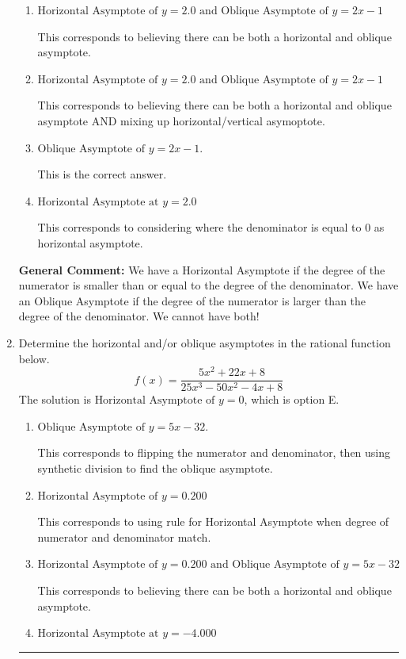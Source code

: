 \documentclass{extbook}[14pt]
\newcommand{\litem}[1]{\item #1

\rule{\textwidth}{0.4pt}}
\begin{document}
\begin{enumerate}
{\begin{enumerate}[label=\Alph*.]
This corresponds to using rule for Horizontal Asymptote when degree of numerator and denominator match.
\item \( \text{Horizontal Asymptote of } y = 2.0 \text{ and Oblique Asymptote of } y = 2x -1 \)

This corresponds to believing there can be both a horizontal and oblique asymptote.
\item \( \text{Horizontal Asymptote of } y = 2.0 \text{ and Oblique Asymptote of } y = 2x -1 \)

This corresponds to believing there can be both a horizontal and oblique asymptote AND mixing up horizontal/vertical asymoptote.
\item \( \text{Oblique Asymptote of } y = 2x -1. \)

This is the correct answer.
\item \( \text{Horizontal Asymptote at } y = 2.0 \)

This corresponds to considering where the denominator is equal to 0 as horizontal asymptote.
\end{enumerate}

\textbf{General Comment:} We have a Horizontal Asymptote if the degree of the numerator is smaller than or equal to the degree of the denominator. We have an Oblique Asymptote if the degree of the numerator is larger than the degree of the denominator. We cannot have both!
}
\litem{
Determine the horizontal and/or oblique asymptotes in the rational function below.
\[ f(x) = \frac{5x^{2} +22 x + 8}{25x^{3} -50 x^{2} -4 x + 8} \]The solution is \( \text{Horizontal Asymptote of } y = 0 \), which is option E.\begin{enumerate}[label=\Alph*.]
\item \( \text{Oblique Asymptote of } y = 5x -32. \)

This corresponds to flipping the numerator and denominator, then using synthetic division to find the oblique asymptote.
\item \( \text{Horizontal Asymptote of } y = 0.200  \)

This corresponds to using rule for Horizontal Asymptote when degree of numerator and denominator match.
\item \( \text{Horizontal Asymptote of } y = 0.200 \text{ and Oblique Asymptote of } y = 5x -32 \)

This corresponds to believing there can be both a horizontal and oblique asymptote.
\item \( \text{Horizontal Asymptote at } y = -4.000 \)


\end{enumerate}}
\end{enumerate}
\end{document}

